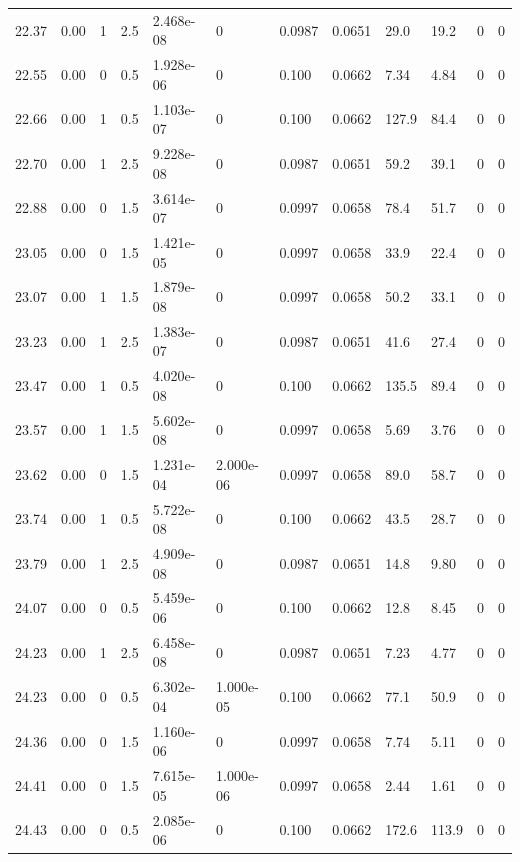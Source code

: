 \documentclass[preview]{standalone}
\begin{document}
{{{{{\begin{tabular}{L{1.2cm}C{1.2cm} C{0.3cm}C{0.5cm} C{1.4cm}C{1.4cm} C{1.4cm}C{1.4cm} C{1.6cm}C{1.6cm} C{1.6cm}C{1.6cm}}
  22.37  &  0.00  & 1     & 2.5 &  2.468e-08  & 0  &  0.0987&   0.0651& 29.0 & 19.2   &  0 & 0  \\ 
  22.55  &  0.00  & 0     & 0.5 &  1.928e-06  & 0  &  0.100&   0.0662& 7.34 & 4.84   &  0 & 0  \\ 
  22.66  &  0.00  & 1     & 0.5 &  1.103e-07  & 0  &  0.100&   0.0662& 127.9 & 84.4   &  0 & 0  \\ 
  22.70  &  0.00  & 1     & 2.5 &  9.228e-08  & 0  &  0.0987&   0.0651& 59.2 & 39.1   &  0 & 0  \\ 
  22.88  &  0.00  & 0     & 1.5 &  3.614e-07  & 0  &  0.0997&   0.0658& 78.4 & 51.7   &  0 & 0  \\ 
  23.05  &  0.00  & 0     & 1.5 &  1.421e-05  & 0  &  0.0997&   0.0658& 33.9 & 22.4   &  0 & 0  \\ 
  23.07  &  0.00  & 1     & 1.5 &  1.879e-08  & 0  &  0.0997&   0.0658& 50.2 & 33.1   &  0 & 0  \\ 
  23.23  &  0.00  & 1     & 2.5 &  1.383e-07  & 0  &  0.0987&   0.0651& 41.6 & 27.4   &  0 & 0  \\ 
  23.47  &  0.00  & 1     & 0.5 &  4.020e-08  & 0  &  0.100&   0.0662& 135.5 & 89.4   &  0 & 0  \\ 
  23.57  &  0.00  & 1     & 1.5 &  5.602e-08  & 0  &  0.0997&   0.0658& 5.69 & 3.76   &  0 & 0  \\ 
  23.62  &  0.00  & 0     & 1.5 &  1.231e-04  & 2.000e-06  &  0.0997&   0.0658& 89.0 & 58.7   &  0 & 0  \\ 
  23.74  &  0.00  & 1     & 0.5 &  5.722e-08  & 0  &  0.100&   0.0662& 43.5 & 28.7   &  0 & 0  \\ 
  23.79  &  0.00  & 1     & 2.5 &  4.909e-08  & 0  &  0.0987&   0.0651& 14.8 & 9.80   &  0 & 0  \\ 
  24.07  &  0.00  & 0     & 0.5 &  5.459e-06  & 0  &  0.100&   0.0662& 12.8 & 8.45   &  0 & 0  \\ 
  24.23  &  0.00  & 1     & 2.5 &  6.458e-08  & 0  &  0.0987&   0.0651& 7.23 & 4.77   &  0 & 0  \\ 
  24.23  &  0.00  & 0     & 0.5 &  6.302e-04  & 1.000e-05  &  0.100&   0.0662& 77.1 & 50.9   &  0 & 0  \\ 
  24.36  &  0.00  & 0     & 1.5 &  1.160e-06  & 0  &  0.0997&   0.0658& 7.74 & 5.11   &  0 & 0  \\ 
  24.41  &  0.00  & 0     & 1.5 &  7.615e-05  & 1.000e-06  &  0.0997&   0.0658& 2.44 & 1.61   &  0 & 0  \\ 
  24.43  &  0.00  & 0     & 0.5 &  2.085e-06  & 0  &  0.100&   0.0662& 172.6 & 113.9   &  0 & 0  \\ 

\end{tabular}}}}}}
\end{document}
